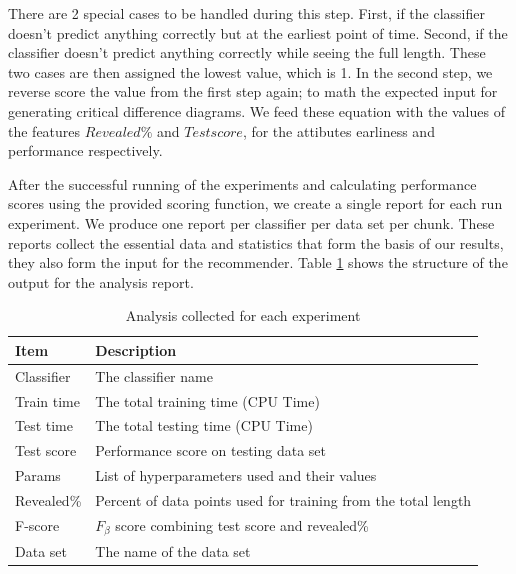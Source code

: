 There are 2 special cases to be handled during this step.
First, if the classifier doesn't predict anything correctly but at the earliest point of time.
Second, if the classifier doesn't predict anything correctly while seeing the full length.
These two cases are then assigned the lowest value, which is 1.
In the second step, we reverse score the value from the first step again; to math the expected input for generating critical difference diagrams.
We feed these equation with the values of the features $Revealed \%$ and $Test score$, for the attibutes earliness and performance respectively.

After the successful running of the experiments and calculating performance scores using the provided scoring function, we create a single report for each run experiment.
We produce one report per classifier per data set per chunk.
These reports collect the essential data and statistics that form the basis of our results, they also form the input for the recommender.
Table \ref{TableAnalysisReport} shows the structure of the output for the analysis report.

\begin{table}
  \setlength\extrarowheight{2pt} %
  \begin{tabularx}{\textwidth}{|X|X|}
  \hline
  \textbf{Item} & \textbf{Description} \\ \hline
    Classifier                 & The classifier name                                             \\ \hline
    Train time                 & The total training time (CPU Time)                              \\ \hline
    Test time                  & The total testing time (CPU Time)                               \\ \hline
    Test score                 & Performance score on testing data set                           \\ \hline
    Params                     & List of hyperparameters used and their values                   \\ \hline
    Revealed\%                 & Percent of data points used for training from the total length  \\ \hline
    F-score                    & $F_{\beta}$ score combining test score and revealed\%         \\ \hline
    Data set                   & The name of the data set                                        \\ \hline
  \end{tabularx}
  \caption{Analysis collected for each experiment}
  \label{TableAnalysisReport}
\end{table}

